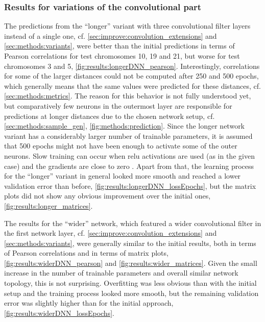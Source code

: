 \subsubsection{Results for variations of the convolutional part} \label{sec:results:wider-longer-etc}
The predictions from the ``longer'' variant with three convolutional filter layers instead of a single one, 
cf. \cref{sec:improve:convolution_extensions} and \ref{sec:methods:variants}, 
were better than the initial predictions in terms of Pearson correlations for test chromosomes 10, 19 and 21, but worse for test chromosomes 3 and 5, 
\cref{fig:results:longerDNN_pearson}.
Interestingly, correlations for some of the larger distances could not be computed after 250 and 500 epochs, 
which generally means that the same values were predicted for these distances, cf. \cref{sec:methods:metrics}.
The reason for this behavior is not fully understood yet, but comparatively few neurons in the outermost layer are responsible for predictions at 
longer distances due to the chosen network setup, cf. \cref{sec:methods:sample_gen}, \cref{fig:methods:prediction}.
Since the longer network variant has a considerably larger number of trainable parameters,
it is assumed that 500 epochs might not have been enough to activate some of the outer neurons.
Slow training can occur when \acrshort{relu} activations are used (as in the given case) and the gradients are close to zero \cite{Maas2013}.
Apart from that, the learning process for the ``longer'' variant in general looked more smooth and reached a lower validation error than before, \cref{fig:results:longerDNN_lossEpochs},
but the matrix plots did not show any obvious improvement over the initial ones, \cref{fig:results:longer_matrices}.

The results for the ``wider'' network, which featured a wider convolutional filter in the first network layer, 
cf. \cref{sec:improve:convolution_extensions} and \ref{sec:methods:variants}, 
were generally similar to the initial results, both in terms of Pearson correlations and in terms of matrix plots, 
\cref{fig:results:widerDNN_pearson} and \ref{fig:results:wider_matrices}.
Given the small increase in the number of trainable parameters and overall similar network topology, this is not surprising.
Overfitting was less obvious than with the initial setup and the training process looked more smooth, 
but the remaining validation error was slightly higher than for the initial approach, \cref{fig:results:widerDNN_lossEpochs}.

